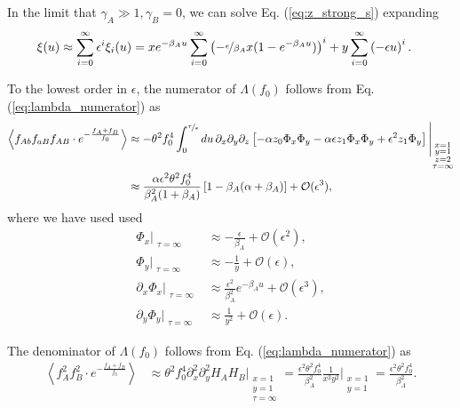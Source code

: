 \documentclass[11pt]{article}
\begin{document}
In the limit that $\gamma_A \gg 1,\gamma_B =0$, we can solve Eq. (\ref{eq:z_strong_s}) expanding
\begin{align}
    \xi (u) &\approx \sum_{i=0}^\infty \epsilon^i \xi_i (u) = xe^{-\beta_A u} \sum_{i=0}^\infty \left(-\nicefrac{\epsilon}{\beta_A}x(1-e^{-\beta_A u})\right)^i
    + y \sum_{i=0}^\infty \left(-\epsilon u\right)^i
    .\label{eq:f(u)_series}
\end{align}

To the lowest order in $\epsilon$, the numerator of $\Lambda(f_0)$ follows from Eq. (\ref{eq:lambda_numerator}) as
\begin{align}\label{eq:lambda_num_large_rho}
    \left\langle f_{Ab}f_{aB}f_{AB}\cdot e^{-\frac{f_{A}+f_{B}}{f_0}}\right\rangle
 &\approx -\theta^2 f_0^4 \int_0^{\nicefrac{\tau}{\epsilon}} du\, \partial_x\partial_y\partial_z \left[-\alpha z_0\Phi_x\Phi_y -\alpha \epsilon z_1 \Phi_x\Phi_y + \epsilon^2 z_1\Phi_y \right]\Bigg\vert_{\substack{x=1 \\ y=1 \\ z=2 \\ \tau=\infty}} \\ \nonumber
 &\approx \frac{\alpha \epsilon^2 \theta^2 f_0^4}{\beta_A^2 (1+\beta_A)} \left[1 - \beta_A(\alpha+\beta_A) \right]+ \mathcal{O}(\epsilon^3),
\end{align}
where we have used used
\begin{subequations}\begin{align}
    \Phi_x \Big\vert_{\substack{\tau=\infty}} &\approx - \frac{\epsilon}{\beta_A} + \mathcal{O}(\epsilon^2)
    , \\
    \Phi_y \Big\vert_{\substack{\tau=\infty}} &\approx - \frac{1}{y} + \mathcal{O}(\epsilon)
    , \\
    \partial_x \Phi_x \Big\vert_{\substack{\tau=\infty}} &\approx \frac{\epsilon^2}{\beta_A^2}e^{-\beta_Au} +\mathcal{O}(\epsilon^3), \\
    \partial_y \Phi_y \Big\vert_{\substack{\tau=\infty}} &\approx \frac{1}{y^2} +\mathcal{O}(\epsilon).
\end{align}\end{subequations}

The denominator of $\Lambda(f_0)$ follows from Eq. (\ref{eq:lambda_numerator}) as 
\begin{align}
    \left\langle f_A^2f_B^2\cdot e^{-\frac{f_{A}+f_{B}}{f_0}}\right\rangle &\approx \theta^2 f_0^4 \partial_x^2 \partial_y^2 H_A H_B \Bigg\vert_{\substack{x=1 \\ y=1 \\ \tau=\infty}} = \frac{\epsilon^2 \theta^2 f_0^4}{\beta_A^2} \frac{1}{x^2y^2}\Bigg\vert_{\substack{x=1 \\ y=1}} = \frac{\epsilon^2 \theta^2 f_0^4}{\beta_A^2}.
\end{align}
\end{document}
